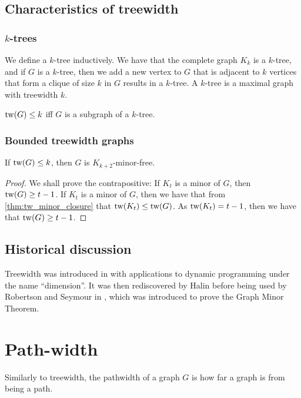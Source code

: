 \subsection{Characteristics of treewidth}\label{ssec:characterising_Treewidth}
\subsubsection{\(k\)-trees}\label{sssec:k-trees}
We define a \(k\)-tree inductively. We have that the complete graph \(K_k\) is a \(k\)-tree, and if \(G\) is a \(k\)-tree, then we add a new vertex to \(G\) that is adjacent to \(k\) vertices that form a clique of size \(k\) in \(G\) results in a \(k\)-tree. 
A \(k\)-tree is a maximal graph with treewidth \(k\). 
\begin{theorem}
	\(\operatorname{tw}(G) \leq k\) iff \(G\) is a subgraph of a \(k\)-tree. 
\end{theorem}


\subsubsection{Bounded treewidth graphs}\label{sssec:Graph_treewidth_Bounded}
\begin{theorem}\label{thm:treewidth_clique-minor-free}
	If \(\operatorname{tw}(G) \leq k\), then \(G\) is \(K_{k+2}\)-minor-free. 
\end{theorem}
\begin{proof}
	We shall prove the contrapositive: If \(K_t\) is a minor of \(G\), then \(\operatorname{tw}(G) \geq t-1\).
	If \(K_t\) is a minor of \(G\), then we have that from \cref{thm:tw_minor_closure} that \(\operatorname{tw}(K_t) \leq \operatorname{tw}(G)\). As \(\operatorname{tw}(K_t) = t-1\), then we have that \(\operatorname{tw}(G) \geq t - 1\). 
\end{proof}

\subsection{Historical discussion}\label{ssec:tw_historical}
Treewidth was introduced in \cite{berteleChapterEliminationVariables1972} with applications to dynamic programming under the name ``dimension''. It was then rediscovered by Halin \cite{halinSfunctionsGraphs1976} before being used by Robertson and Seymour in \cite{robertsonGraphMinorsIII1984}, which was introduced to prove the Graph Minor Theorem\cite{robertsonGraphMinorsXX2004}.


\section{Path-width}\label{sec:Pathwidth}
Similarly to treewidth, the pathwidth of a graph \(G\) is how far a graph is from being a path. 

